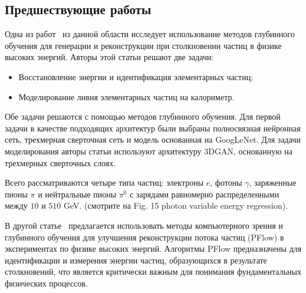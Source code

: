 \documentclass[a4paper,12pt]{extarticle}
\begin{document}
\subsection{Предшествующие работы}

Одна из работ~\cite{Belayneh_2020} из данной области исследует использование методов глубинного обучения для генерации и реконструкции при столкновении частиц в физике высоких энергий. Авторы этой статьи решают две задачи:

\begin{itemize}
    \item Восстановление энергии и идентификация элементарных частиц;
    \item Моделирование ливня элементарных частиц на калориметр.
\end{itemize}

Обе задачи решаются с помощью методов глубинного обучения. Для первой задачи в качестве подходящих архитектур были выбраны полносвязная нейронная сеть, трехмерная сверточная сеть и модель основанная на GoogLeNet. Для задачи моделирования авторы статьи используют архитектуру 3DGAN, основанную на трехмерных сверточных слоях.

Всего рассматриваются четыре типа частиц: электроны $e$, фотоны $\gamma$, заряженные пионы $\pi$ и нейтральные пионы $\pi^0$ с зарядами равномерно распределенными между $10$ и $510$ GeV. (смотрите на Fig. 15 photon variable energy regression).

В другой статье~\cite{Di_Bello_2021} предлагается использовать методы компьютерного зрения и глубинного обучения для улучшения реконструкции потока частиц (PFlow) в экспериментах по физике высоких энергий. Алгоритмы PFlow предназначены для идентификации и измерения энергии частиц, образующихся в результате столкновений, что является критически важным для понимания фундаментальных физических процессов.
\end{document}
